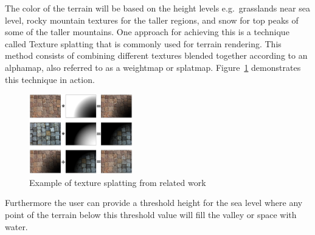 The color of the terrain will be based on the height levels e.g.\ grasslands near sea level, rocky mountain textures for the taller regions, and snow for top peaks of some of the taller mountains.
One approach for achieving this is a technique called Texture splatting that is commonly used for terrain rendering.
This method consists of combining different textures blended together according to an alphamap, also referred to as a weightmap or splatmap.
Figure~\ref{fig:texture-splatting} demonstrates this technique in action.

\begin{figure}[h]
  \centering
  \includegraphics[width=0.4\textwidth]{figure/texture-splatting.png}
  \caption{Example of texture splatting from related work \cite{wiki:texture-splatting-img}}
  \label{fig:texture-splatting}
\end{figure}

Furthermore the user can provide a threshold height for the sea level where any point of the terrain below this threshold value will fill the valley or space with water.
